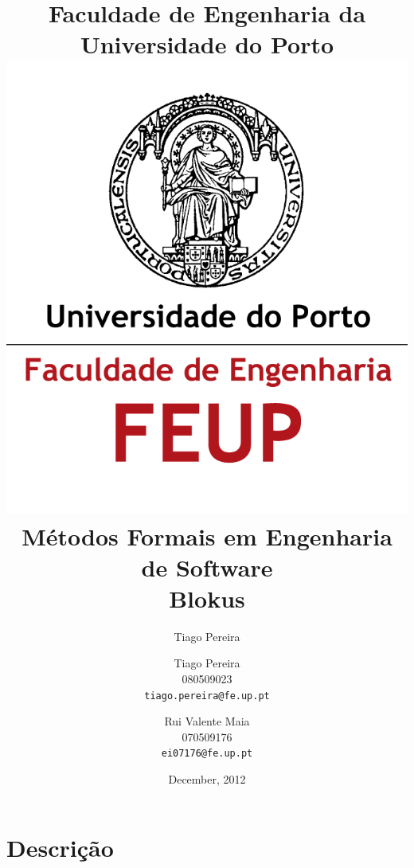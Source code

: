 \documentclass[12pt]{report}
\begin{document}
	\title{Faculdade de Engenharia da Universidade do Porto \\
			\includegraphics{logo-feup.png} \\
			\Large Métodos Formais em Engenharia de Software \\
			\large Blokus}

	\author{Tiago Pereira}
	\author{Tiago Pereira\\
		  080509023\\
		  \texttt{tiago.pereira@fe.up.pt}\\
		\and
		  Rui Valente Maia\\
		  070509176\\
		  \texttt{ei07176@fe.up.pt}\\}

	\date{December, 2012}
	\maketitle

	\tableofcontents
	\listoffigures

	\chapter{Descrição}
		
\end{document}
